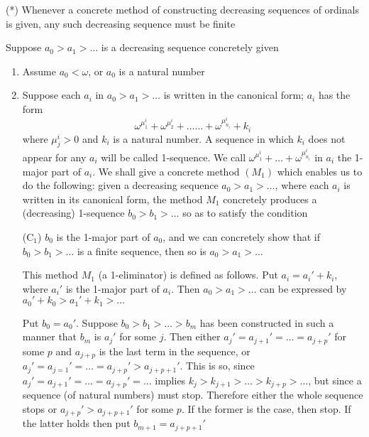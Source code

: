 \documentclass[11pt]{article}
\begin{document}
\begin{center}
(*) Whenever a concrete method of constructing decreasing sequences of ordinals is given, any
such decreasing sequence must be finite
\end{center}


Suppose \(a_0>a_1>\dots\) is a decreasing sequence concretely given
\begin{enumerate}
\item Assume \(a_0<\omega\), or \(a_0\) is a natural number
\item Suppose each \(a_i\) in \(a_0>a_1>\dots\) is written in the canonical form; \(a_i\) has the
form
\begin{equation*}
\omega^{\mu_1^i}+\omega^{\mu_2^i}+\dots\dots+\omega^{\mu_{n_i}^i}+k_i
\end{equation*}
where \(\mu_j^i>0\) and \(k_i\) is a natural number. A sequence in which \(k_i\) does not
appear for any \(a_i\) will be called 1-sequence. We call \(\omega^{\mu_1^i}+\dots+\omega^{\mu_{n_i}^i}\)
in \(a_i\) the 1-major part of \(a_i\). We shall give a concrete method \((M_1)\) which
enables us to do the following: given a decreasing sequence \(a_0>a_1>\dots\), where
each \(a_i\) is written in its canonical form, the method \(M_1\) concretely produces a
(decreasing) 1-sequence \(b_0>b_1>\dots\) so as to satisfy the condition

\begin{center}
(\(\text{C}_1\)) \(b_0\) is the 1-major part of \(a_0\), and we can concretely show that
if \(b_0>b_1>\dots\) is a finite sequence, then so is \(a_0>a_1>\dots\)
\end{center}

This method \(M_1\) (a 1-eliminator) is defined as follows. Put \(a_i=a_i'+k_i\),
where \(a_i'\) is the 1-major part of \(a_i\). Then \(a_0>a_1>\dots\) can be expressed by
\(a_0'+k_0>a_1'+k_1>\dots\)

Put \(b_0=a_0'\). Suppose \(b_0>b_1>\dots>b_m\) has been constructed in such a manner
that \(b_m\) is \(a_j'\) for some \(j\). Then either \(a_j'=a_{j+1}' =\dots =a_{j+p}'\) for
some \(p\) and \(a_{j+p}\) is the last term in the sequence,
or \(a_j'=a_{j=1}' =\dots =a_{j+p}'>a_{j+p+1}'\). This is so,
since \(a_j' =a_{j+1}' =\dots =a_{j+p}' =\dots\) implies \(k_j>k_{j+1}>\dots>k_{j+p}>\dots\),
but since a sequence (of natural numbers) must stop. Therefore either the whole sequence stops
or \(a_{j+p}'>a_{j+p+1}'\) for some \(p\). If the former is the case, then stop. If the latter
holds then put \(b_{m+1}=a_{j+p+1}'\)


\end{enumerate}
\end{document}
